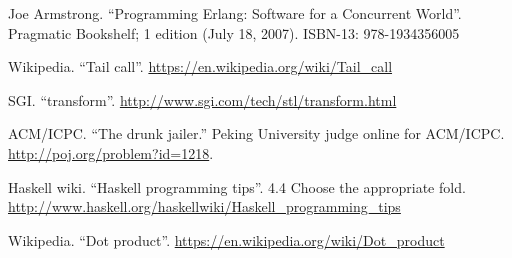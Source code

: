 \documentclass[b5paper]{ctexart}
\begin{document}
\begin{thebibliography}{99}
Joe Armstrong. ``Programming Erlang: Software for a Concurrent World''. Pragmatic Bookshelf; 1 edition (July 18, 2007). ISBN-13: 978-1934356005

Wikipedia. ``Tail call''. \url{https://en.wikipedia.org/wiki/Tail_call}

SGI. ``transform''. \url{http://www.sgi.com/tech/stl/transform.html}

ACM/ICPC. ``The drunk jailer.'' Peking University judge online for ACM/ICPC. \url{http://poj.org/problem?id=1218}.

Haskell wiki. ``Haskell programming tips''. 4.4 Choose the appropriate fold. \url{http://www.haskell.org/haskellwiki/Haskell_programming_tips}

Wikipedia. ``Dot product''. \url{https://en.wikipedia.org/wiki/Dot_product}

\end{thebibliography}

\expandafter\enddocument
\fi
\end{document}
